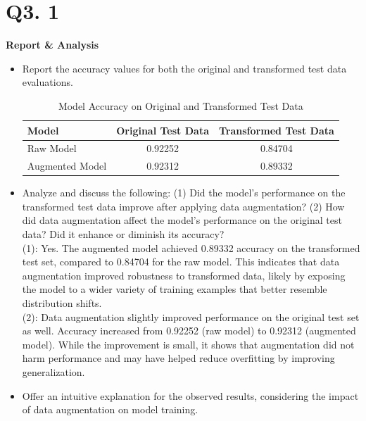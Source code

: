 \documentclass{article}
\begin{document}
\section*{Q3. 1}
\textbf{Report \& Analysis}
    \begin{itemize}
        \item Report the accuracy values for both the original and transformed test data evaluations. 
        \begin{table}[h!]
        \centering
        \caption{Model Accuracy on Original and Transformed Test Data}
        \begin{tabular}{lcc}
        \hline
        \textbf{Model} & \textbf{Original Test Data} & \textbf{Transformed Test Data} \\ 
        \hline
        Raw Model & 0.92252  & 0.84704 \\
        Augmented Model & 0.92312 & 0.89332 \\
        \hline
        \end{tabular}
        \end{table}
        
        \item Analyze and discuss the following: (1) Did the model's performance on the transformed test data improve after applying data augmentation? (2) How did data augmentation affect the model's performance on the original test data? Did it enhance or diminish its accuracy? \\
        
        (1): Yes. The augmented model achieved 0.89332 accuracy on the transformed test set, compared to 0.84704 for the raw model. This indicates that data augmentation improved robustness to transformed data, likely by exposing the model to a wider variety of training examples that better resemble distribution shifts. \\

        (2): Data augmentation slightly improved performance on the original test set as well. Accuracy increased from 0.92252 (raw model) to 0.92312 (augmented model). While the improvement is small, it shows that augmentation did not harm performance and may have helped reduce overfitting by improving generalization.\\
        
        \item Offer an intuitive explanation for the observed results, considering the impact of data augmentation on model training. \\


\end{itemize}
\end{document}
